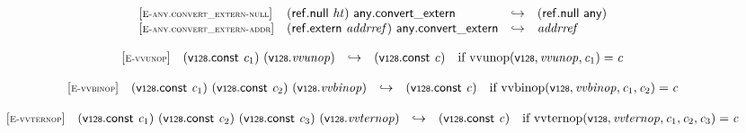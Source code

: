 $$
\begin{array}{@{}l@{}lcl@{}l@{}}
{[\textsc{\scriptsize E{-}any.convert\_extern{-}null}]} \quad & (\mathsf{ref.null}~{\mathit{ht}})~\mathsf{any.convert\_extern} &\hookrightarrow& (\mathsf{ref.null}~\mathsf{any}) &  \\
{[\textsc{\scriptsize E{-}any.convert\_extern{-}addr}]} \quad & (\mathsf{ref.extern}~{\mathit{addrref}})~\mathsf{any.convert\_extern} &\hookrightarrow& {\mathit{addrref}} &  \\
\end{array}
$$

\vspace{1ex}

$$
\begin{array}{@{}l@{}lcl@{}l@{}}
{[\textsc{\scriptsize E{-}vvunop}]} \quad & (\mathsf{v{\scriptstyle128}}.\mathsf{const}~{\mathit{c}}_{{1}})~(\mathsf{v{\scriptstyle128}} . {\mathit{vvunop}}) &\hookrightarrow& (\mathsf{v{\scriptstyle128}}.\mathsf{const}~{\mathit{c}}) &\quad
  \mbox{if}~{\mathrm{vvunop}}(\mathsf{v{\scriptstyle128}}, {\mathit{vvunop}}, {\mathit{c}}_{{1}}) = {\mathit{c}} \\
\end{array}
$$

\vspace{1ex}

$$
\begin{array}{@{}l@{}lcl@{}l@{}}
{[\textsc{\scriptsize E{-}vvbinop}]} \quad & (\mathsf{v{\scriptstyle128}}.\mathsf{const}~{\mathit{c}}_{{1}})~(\mathsf{v{\scriptstyle128}}.\mathsf{const}~{\mathit{c}}_{{2}})~(\mathsf{v{\scriptstyle128}} . {\mathit{vvbinop}}) &\hookrightarrow& (\mathsf{v{\scriptstyle128}}.\mathsf{const}~{\mathit{c}}) &\quad
  \mbox{if}~{\mathrm{vvbinop}}(\mathsf{v{\scriptstyle128}}, {\mathit{vvbinop}}, {\mathit{c}}_{{1}}, {\mathit{c}}_{{2}}) = {\mathit{c}} \\
\end{array}
$$

\vspace{1ex}

$$
\begin{array}{@{}l@{}lcl@{}l@{}}
{[\textsc{\scriptsize E{-}vvternop}]} \quad & (\mathsf{v{\scriptstyle128}}.\mathsf{const}~{\mathit{c}}_{{1}})~(\mathsf{v{\scriptstyle128}}.\mathsf{const}~{\mathit{c}}_{{2}})~(\mathsf{v{\scriptstyle128}}.\mathsf{const}~{\mathit{c}}_{{3}})~(\mathsf{v{\scriptstyle128}} . {\mathit{vvternop}}) &\hookrightarrow& (\mathsf{v{\scriptstyle128}}.\mathsf{const}~{\mathit{c}}) &\quad
  \mbox{if}~{\mathrm{vvternop}}(\mathsf{v{\scriptstyle128}}, {\mathit{vvternop}}, {\mathit{c}}_{{1}}, {\mathit{c}}_{{2}}, {\mathit{c}}_{{3}}) = {\mathit{c}} \\
\end{array}
$$

